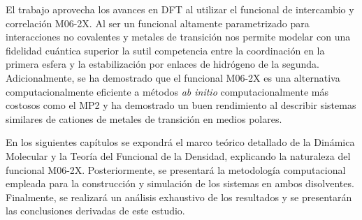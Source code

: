 El trabajo aprovecha los avances en DFT al utilizar el funcional de intercambio y correlación M06-2X. Al ser un funcional altamente parametrizado para interacciones no covalentes y metales de transición \cite{DFT-2008-01} nos permite modelar con una fidelidad cuántica superior la sutil competencia entre la coordinación en la primera esfera y la estabilización por enlaces de hidrógeno de la segunda. Adicionalmente, se ha demostrado que el funcional M06-2X es una alternativa computacionalmente eficiente a métodos \textit{ab initio} computacionalmente más costosos como el MP2 y ha demostrado un buen rendimiento al describir sistemas similares de cationes de metales de transición en medios polares.

En los siguientes capítulos se expondrá el marco teórico detallado de la Dinámica Molecular y la Teoría del Funcional de la Densidad, explicando la naturaleza del funcional M06-2X. Posteriormente, se presentará la metodología computacional empleada para la construcción y simulación de los sistemas en ambos disolventes. Finalmente, se realizará un análisis exhaustivo de los resultados y se presentarán las conclusiones derivadas de este estudio.
